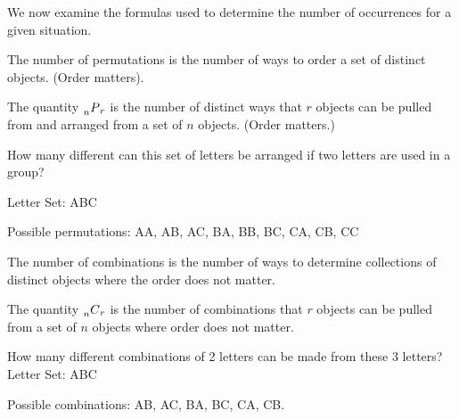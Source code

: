 
We now examine the formulas used to determine the number of
occurrences for a given situation.

\begin{definition}
  The number of permutations is the number of ways to order a set of
  distinct objects. (Order matters).
\end{definition}


\begin{notation}
  The quantity $\prescript{~}{n}{P}_r$ is the number of distinct ways
  that $r$ objects can be pulled from and arranged from a set of $n$
  objects.  (Order matters.)
\end{notation}

\begin{example}
  How many different can this set of letters be arranged if two
  letters are used in a group?

  Letter Set: ABC

  Possible permutations: AA, AB, AC, BA, BB, BC, CA, CB, CC
\end{example}

\begin{definition}
  The number of combinations is the number of ways to determine
  collections of distinct objects where the order does not matter.
\end{definition}

\begin{notation}
  The quantity $\prescript{~}{n}{C}_r$ is the number of combinations
  that $r$ objects can be pulled from a set of $n$ objects where order
  does not matter.
\end{notation}


\begin{example}
  How many different combinations of 2 letters can be made from these 3 letters?\\ [12pt]
  Letter Set: ABC

  Possible combinations: AB, AC, BA, BC, CA, CB.
\end{example}

\clearpage

